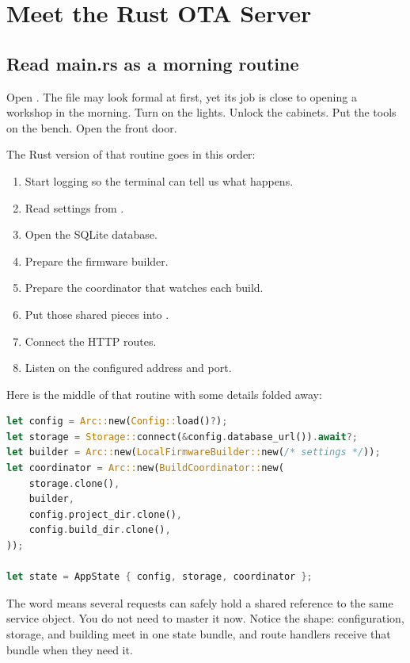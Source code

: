 \chapter{Meet the Rust OTA Server}

\section{Read main.rs as a morning routine}

Open . The file may look formal at first, yet its job is close to opening a workshop in the morning. Turn on the lights. Unlock the cabinets. Put the tools on the bench. Open the front door.

The Rust version of that routine goes in this order:

\begin{enumerate}
  \item Start logging so the terminal can tell us what happens.
  \item Read settings from .
  \item Open the SQLite database.
  \item Prepare the firmware builder.
  \item Prepare the coordinator that watches each build.
  \item Put those shared pieces into .
  \item Connect the HTTP routes.
  \item Listen on the configured address and port.
\end{enumerate}

Here is the middle of that routine with some details folded away:

\begin{lstlisting}[language=Rust]
let config = Arc::new(Config::load()?);
let storage = Storage::connect(&config.database_url()).await?;
let builder = Arc::new(LocalFirmwareBuilder::new(/* settings */));
let coordinator = Arc::new(BuildCoordinator::new(
    storage.clone(),
    builder,
    config.project_dir.clone(),
    config.build_dir.clone(),
));

let state = AppState { config, storage, coordinator };
\end{lstlisting}

The word  means several requests can safely hold a shared reference to the same service object. You do not need to master it now. Notice the shape: configuration, storage, and building meet in one state bundle, and route handlers receive that bundle when they need it.

